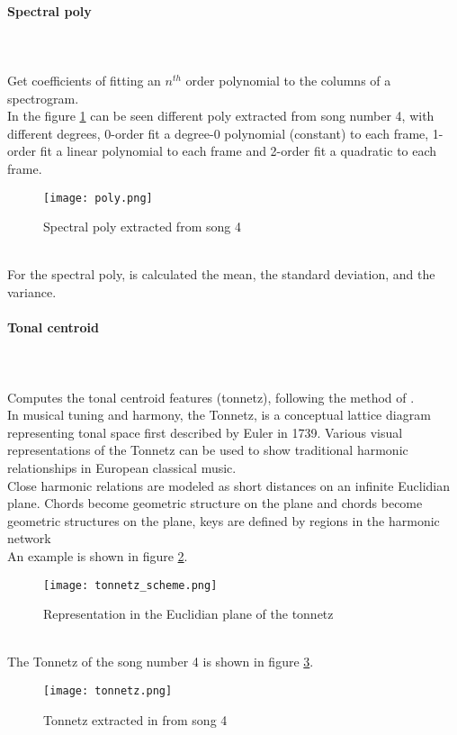 \paragraph{Spectral poly}
\mbox{} \\ \\
Get coefficients of fitting an $n^{th}$ order polynomial to the columns of a spectrogram.
\\
In the figure \ref{fig:poly} can be seen different poly extracted from song number 4, with different degrees, 0-order fit a degree-0 polynomial (constant) to each frame, 1-order fit a linear polynomial to each frame and 2-order fit a quadratic to each frame.
\begin{figure}[h]
    \centering
    \texttt{[image: poly.png]} 
	\caption{Spectral poly extracted from song 4}
    \label{fig:poly}
\end{figure}
\\
For the spectral poly, is calculated the mean, the standard deviation, and the variance.

\paragraph{Tonal centroid}
\mbox{} \\ \\
Computes the tonal centroid features (tonnetz), following the method of \cite{harte2006detecting}.
\\
In musical tuning and harmony, the Tonnetz, is a conceptual lattice diagram representing tonal space first described by Euler in 1739. Various visual representations of the Tonnetz can be used to show traditional harmonic relationships in European classical music.
\\
Close harmonic relations are modeled as short distances on an infinite Euclidian plane. Chords become geometric structure on the plane and chords become geometric structures on the plane, keys are defined by regions in the harmonic network
\\
An example is shown in figure \ref{fig:tonnetz_scheme}.
\begin{figure}[h]
    \centering
    \texttt{[image: tonnetz\_scheme.png]} 
	\caption{Representation in the Euclidian plane of the tonnetz}
    \label{fig:tonnetz_scheme}
\end{figure}
\\
The Tonnetz of the song number 4 is shown in figure \ref{fig:tonnetz}.
\\
\begin{figure}[h]
    \centering
    \texttt{[image: tonnetz.png]} 
	\caption{Tonnetz extracted in from song 4}
    \label{fig:tonnetz}
\end{figure}

